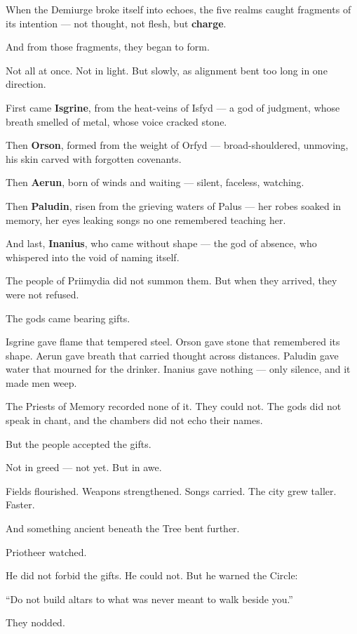 \documentclass[9pt]{article}
\begin{document}
When the Demiurge broke itself into echoes, the five realms caught fragments of its intention —  
not thought, not flesh, but \textbf{charge}.

And from those fragments, they began to form.

Not all at once.  
Not in light.  
But slowly, as alignment bent too long in one direction.

First came \textbf{Isgrine}, from the heat-veins of Isfyd — a god of judgment, whose breath smelled of metal, whose voice cracked stone.  

Then \textbf{Orson}, formed from the weight of Orfyd — broad-shouldered, unmoving, his skin carved with forgotten covenants.  

Then \textbf{Aerun}, born of winds and waiting — silent, faceless, watching.  

Then \textbf{Paludin}, risen from the grieving waters of Palus — her robes soaked in memory, her eyes leaking songs no one remembered teaching her.  

And last, \textbf{Inanius}, who came without shape — the god of absence, who whispered into the void of naming itself.

The people of Priimydia did not summon them.  
But when they arrived, they were not refused.

The gods came bearing gifts.

Isgrine gave flame that tempered steel.  
Orson gave stone that remembered its shape.  
Aerun gave breath that carried thought across distances.  
Paludin gave water that mourned for the drinker.  
Inanius gave nothing — only silence, and it made men weep.

The Priests of Memory recorded none of it.  
They could not.  
The gods did not speak in chant, and the chambers did not echo their names.

But the people accepted the gifts.

Not in greed — not yet.  
But in awe.

Fields flourished.  
Weapons strengthened.  
Songs carried.  
The city grew taller.  
Faster.

And something ancient beneath the Tree bent further.

Priotheer watched.

He did not forbid the gifts.  
He could not.  
But he warned the Circle:

“Do not build altars to what was never meant to walk beside you.”

They nodded.
\end{document}

